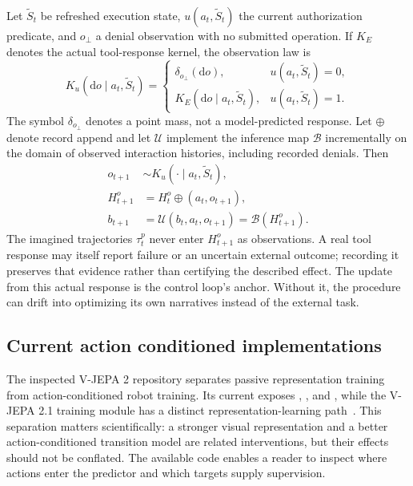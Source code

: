 Let $\widetilde S_t$ be refreshed execution state, $u(a_t,\widetilde S_t)$ the current authorization predicate, and $o_\bot$ a denial observation with no submitted operation. If $K_E$ denotes the actual tool-response kernel, the observation law is
\begin{equation}
 K_u(\mathrm d o\mid a_t,\widetilde S_t)=
 \begin{cases}
 \delta_{o_\bot}(\mathrm d o),&u(a_t,\widetilde S_t)=0,\\
 K_E(\mathrm d o\mid a_t,\widetilde S_t),
 &u(a_t,\widetilde S_t)=1.
 \end{cases}
\label{eq:C06:authorizedobservation}
\end{equation}
The symbol $\delta_{o_\bot}$ denotes a point mass, not a model-predicted response. Let $\oplus$ denote record append and let $\mathcal U$ implement the inference map $\mathcal B$ incrementally on the domain of observed interaction histories, including recorded denials. Then
\begin{equation}
\begin{aligned}
 o_{t+1}&\sim K_u(\cdot\mid a_t,\widetilde S_t),\\
 H_{t+1}^o&=H_t^o\oplus(a_t,o_{t+1}),\\
 b_{t+1}&=\mathcal U(b_t,a_t,o_{t+1})
 =\mathcal B(H_{t+1}^o).
\end{aligned}
\label{eq:C06:observedupdate}
\end{equation}
The imagined trajectories $\widehat\tau_t^p$ never enter $H_{t+1}^o$ as observations. A real tool response may itself report failure or an uncertain external outcome; recording it preserves that evidence rather than certifying the described effect. The update from this actual response is the control loop's anchor. Without it, the procedure can drift into optimizing its own narratives instead of the external task.

\subsection{Current action conditioned implementations}
The inspected V-JEPA 2 repository separates passive representation training from action-conditioned robot training. Its current  exposes , , and , while the V-JEPA 2.1 training module has a distinct representation-learning path~\cite{rewrite_vjepa2_repo}. This separation matters scientifically: a stronger visual representation and a better action-conditioned transition model are related interventions, but their effects should not be conflated. The available code enables a reader to inspect where actions enter the predictor and which targets supply supervision.


